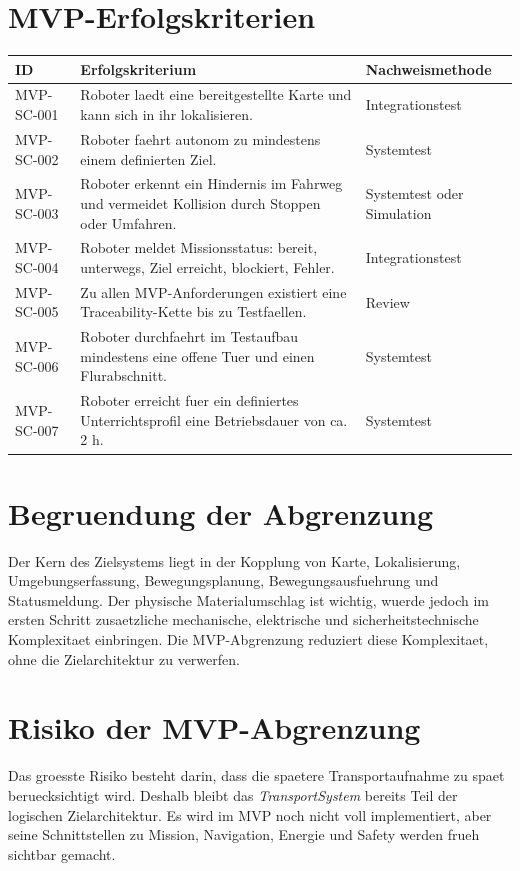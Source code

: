 \section{MVP-Erfolgskriterien}

\begin{longtable}{L{0.14\textwidth} L{0.48\textwidth} L{0.26\textwidth}}
\toprule
ID & Erfolgskriterium & Nachweismethode \\
\midrule
MVP-SC-001 & Roboter laedt eine bereitgestellte Karte und kann sich in ihr lokalisieren. & Integrationstest \\
MVP-SC-002 & Roboter faehrt autonom zu mindestens einem definierten Ziel. & Systemtest \\
MVP-SC-003 & Roboter erkennt ein Hindernis im Fahrweg und vermeidet Kollision durch Stoppen oder Umfahren. & Systemtest oder Simulation \\
MVP-SC-004 & Roboter meldet Missionsstatus: bereit, unterwegs, Ziel erreicht, blockiert, Fehler. & Integrationstest \\
MVP-SC-005 & Zu allen MVP-Anforderungen existiert eine Traceability-Kette bis zu Testfaellen. & Review \\
MVP-SC-006 & Roboter durchfaehrt im Testaufbau mindestens eine offene Tuer und einen Flurabschnitt. & Systemtest \\
MVP-SC-007 & Roboter erreicht fuer ein definiertes Unterrichtsprofil eine Betriebsdauer von ca. 2 h. & Systemtest \\
\bottomrule
\end{longtable}

\section{Begruendung der Abgrenzung}

Der Kern des Zielsystems liegt in der Kopplung von Karte, Lokalisierung, Umgebungserfassung, Bewegungsplanung, Bewegungsausfuehrung und Statusmeldung. Der physische Materialumschlag ist wichtig, wuerde jedoch im ersten Schritt zusaetzliche mechanische, elektrische und sicherheitstechnische Komplexitaet einbringen. Die MVP-Abgrenzung reduziert diese Komplexitaet, ohne die Zielarchitektur zu verwerfen.

\section{Risiko der MVP-Abgrenzung}

Das groesste Risiko besteht darin, dass die spaetere Transportaufnahme zu spaet beruecksichtigt wird. Deshalb bleibt das \emph{TransportSystem} bereits Teil der logischen Zielarchitektur. Es wird im MVP noch nicht voll implementiert, aber seine Schnittstellen zu Mission, Navigation, Energie und Safety werden frueh sichtbar gemacht.
